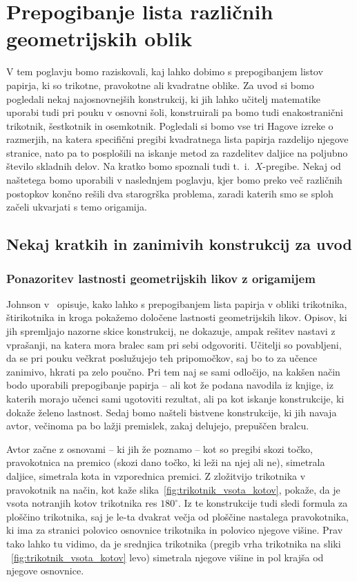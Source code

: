 \section{Prepogibanje lista različnih geometrijskih oblik}
\label{pogl:prepog_geom_likov}

V tem poglavju bomo raziskovali, kaj lahko dobimo s prepogibanjem listov papirja, ki so trikotne, pravokotne ali kvadratne oblike. Za uvod si bomo pogledali nekaj najosnovnejših konstrukcij, ki jih lahko učitelj matematike uporabi tudi pri pouku v osnovni šoli, konstruirali pa bomo tudi enakostranični trikotnik, šestkotnik in osemkotnik. Pogledali si bomo vse tri Hagove izreke o razmerjih, na katera specifični pregibi kvadratnega lista papirja razdelijo njegove stranice, nato pa to posplošili na iskanje metod za razdelitev daljice na poljubno število skladnih delov. Na kratko bomo spoznali tudi t.~i.\ $X$-pregibe. Nekaj od naštetega bomo uporabili v naslednjem poglavju, kjer bomo preko več različnih postopkov končno rešili dva starogrška problema, zaradi katerih smo se sploh začeli ukvarjati s temo origamija.

\subsection{Nekaj kratkih in zanimivih konstrukcij za uvod}

\subsubsection*{Ponazoritev lastnosti geometrijskih likov z origamijem}

Johnson v~\cite{johnson1957} opisuje, kako lahko s prepogibanjem lista papirja v obliki trikotnika, štirikotnika in kroga pokažemo določene lastnosti geometrijskih likov. Opisov, ki jih spremljajo nazorne skice konstrukcij, ne dokazuje, ampak rešitev nastavi z vprašanji, na katera mora bralec sam pri sebi odgovoriti. Učitelji so povabljeni, da se pri pouku večkrat poslužujejo teh pripomočkov, saj bo to za učence zanimivo, hkrati pa zelo poučno. Pri tem naj se sami odločijo, na kakšen način bodo uporabili prepogibanje papirja -- ali kot že podana navodila iz knjige, iz katerih morajo učenci sami ugotoviti rezultat, ali pa kot iskanje konstrukcije, ki dokaže želeno lastnost. Sedaj bomo našteli bistvene konstrukcije, ki jih navaja avtor, večinoma pa bo lažji premislek, zakaj delujejo, prepuščen bralcu.

Avtor začne z osnovami -- ki jih že poznamo -- kot so pregibi skozi točko, pravokotnica na premico (skozi dano točko, ki leži na njej ali ne), simetrala daljice, simetrala kota in vzporednica premici. Z zložitvijo trikotnika v pravokotnik na način, kot kaže slika~\ref{fig:trikotnik_vsota_kotov}, pokaže, da je vsota notranjih kotov trikotnika res $180^\circ$. Iz te konstrukcije tudi sledi formula za ploščino trikotnika, saj je le-ta dvakrat večja od ploščine nastalega pravokotnika, ki ima za stranici polovico osnovnice trikotnika in polovico njegove višine. Prav tako lahko tu vidimo, da je srednjica trikotnika (pregib vrha trikotnika na sliki ~\ref{fig:trikotnik_vsota_kotov} levo) simetrala njegove višine in pol krajša od njegove osnovnice.

